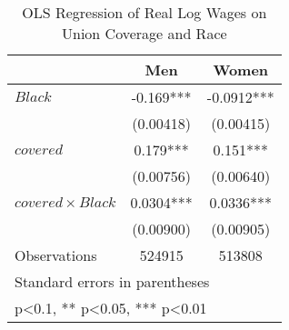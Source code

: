\begin{table}[htbp]\centering
\def\sym#1{\ifmmode^{#1}\else\(^{#1}\)\fi}
\caption{OLS Regression of Real Log Wages on Union Coverage and Race}
\begin{tabular}{l*{2}{c}}
\hline\hline
                    &\multicolumn{1}{c}{Men}&\multicolumn{1}{c}{Women}\\
\hline
$ Black $           &      -0.169***&     -0.0912***\\
                    &   (0.00418)   &   (0.00415)   \\
[1em]
$ covered $         &       0.179***&       0.151***\\
                    &   (0.00756)   &   (0.00640)   \\
[1em]
$ covered \times Black $&      0.0304***&      0.0336***\\
                    &   (0.00900)   &   (0.00905)   \\
\hline
Observations        &      524915   &      513808   \\
\hline\hline
\multicolumn{3}{l}{\footnotesize Standard errors in parentheses}\\
\multicolumn{3}{l}{\footnotesize * p<0.1, ** p<0.05, *** p<0.01}\\
\end{tabular}
\end{table}
